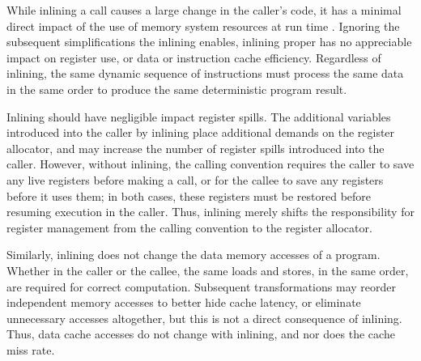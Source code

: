 While inlining a call causes a large change in the caller's code, it has a minimal direct impact of the use of memory system resources at run time \cite{BerubePhD}.  Ignoring the subsequent simplifications the inlining enables, inlining proper has no appreciable impact on register use, or data or instruction cache efficiency.  Regardless of inlining, the same dynamic sequence of instructions must process the same data in the same order to produce the same deterministic program result.

Inlining should have negligible impact register spills.  The additional variables introduced into the caller by inlining place additional demands on the register allocator, and may increase the number of register spills introduced into the caller.  However, without inlining, the calling convention requires the caller to save any live registers before making a call, or for the callee to save any registers before it uses them; in both cases, these registers must be restored before resuming execution in the caller. Thus, inlining merely shifts the responsibility for register management from the calling convention to the register allocator.

Similarly, inlining does not change the data memory accesses of a program.  Whether in the caller or the callee, the same loads and stores, in the same order, are required for correct computation. Subsequent transformations may reorder independent memory accesses to better hide cache latency, or eliminate unnecessary accesses altogether, but this is not a direct consequence of inlining.  Thus, data cache accesses do not change with inlining, and nor does the cache miss rate.  
